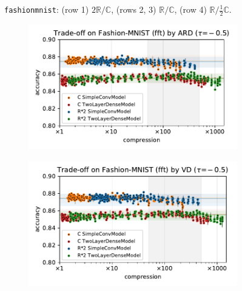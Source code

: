 \documentclass[a4paper,10pt,onecolumn]{article}
\newcommand{\real}{\mathbb{R}}
\newcommand{\cplx}{\mathbb{C}}
\begin{document}
\begin{figure}[b]
\begin{subfigure}[b]{0.5\columnwidth}
  \end{subfigure}
  \caption{%
    \texttt{fashionmnist}: (row 1) $2\real / \cplx$, (rows 2, 3) $\real / \cplx$, (row 4) $\real / \tfrac12\cplx$.
  }
\end{figure}

\begin{figure}[b]
  \centering
  \begin{subfigure}[b]{0.5\columnwidth}
    \centering
    \includegraphics[width=\columnwidth]{figure__mnist-like__trade-off/appendix__cmp__ARD__fashionmnist__fft__-0.5.pdf}
  \end{subfigure}%
  \begin{subfigure}[b]{0.5\columnwidth}
    \centering
    \includegraphics[width=\columnwidth]{figure__mnist-like__trade-off/appendix__cmp__VD__fashionmnist__fft__-0.5.pdf}
  \end{subfigure} \\%
  \begin{subfigure}[b]{0.5\columnwidth}

\end{subfigure}
\end{figure}
\end{document}
